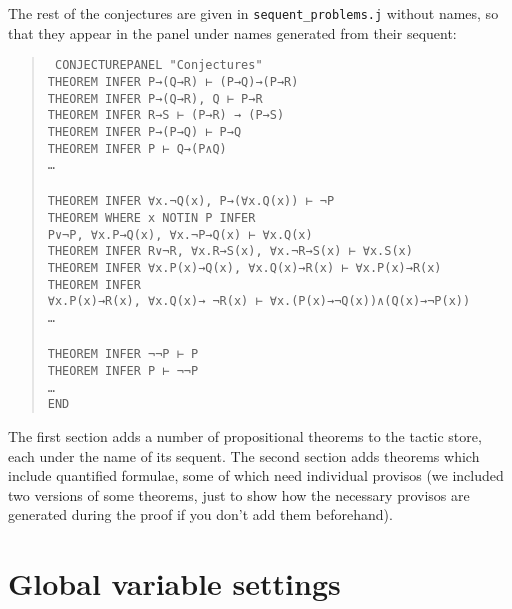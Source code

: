 The rest of the conjectures are given in \texttt{sequent\_problems.j} without names, so that they appear in the panel under names generated from their sequent:
\begin{quote}\tt\small
CONJECTUREPANEL "Conjectures"\\
\tab THEOREM INFER P→(Q→R)                         ⊢ (P→Q)→(P→R)\\
\tab THEOREM INFER P→(Q→R), Q                      ⊢ P→R\\
\tab THEOREM INFER R→S                              ⊢ (P→R) → (P→S)\\
\tab THEOREM INFER P→(P→Q)                         ⊢ P→Q\\
\tab THEOREM INFER P                                 ⊢ Q→(P∧Q)\\
\tab \dots  \\
\\
\tab THEOREM INFER ∀x.¬Q(x),  P→(∀x.Q(x))                              ⊢ ¬P\\
\tab THEOREM WHERE x NOTIN P INFER \\
\tab \tab P∨¬P, ∀x.P→Q(x), ∀x.¬P→Q(x)     ⊢ ∀x.Q(x)\\
\tab THEOREM INFER R∨¬R, ∀x.R→S(x), ∀x.¬R→S(x)                     ⊢ ∀x.S(x)\\
\tab THEOREM INFER ∀x.P(x)→Q(x), ∀x.Q(x)→R(x)                          ⊢ ∀x.P(x)→R(x)\\
\tab THEOREM INFER \\
\tab \tab ∀x.P(x)→R(x), ∀x.Q(x)→ ¬R(x) ⊢ ∀x.(P(x)→¬Q(x))∧(Q(x)→¬P(x))\\
\tab \dots \\
\tab \\
\tab THEOREM INFER ¬¬P                             ⊢ P\\
\tab THEOREM INFER P                                 ⊢ ¬¬P\\
\tab \dots \\
END
\end{quote}
The first section adds a number of propositional theorems to the tactic store, each under the name of its sequent. The second section adds theorems which include quantified formulae, some of which need individual provisos (we included two versions of some theorems, just to show how the necessary provisos are generated during the proof if you don't add them beforehand).

\section{Global variable settings}

